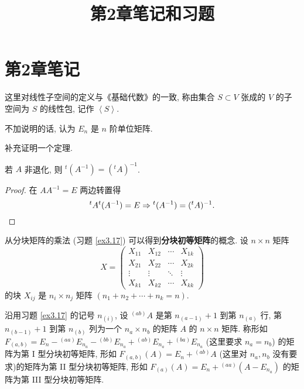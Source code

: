 \documentclass[color=black,device=normal,lang=cn,mode=geye]{elegantnote}
\title{第2章笔记和习题}
\begin{document}
\maketitle
\section{第2章笔记}
这里对线性子空间的定义与《基础代数》的一致, 称由集合 $S\subset V$ 张成的 $V$ 的子空间为 $S$ 的线性包, 记作 $\left<S\right>$.

不加说明的话, 认为 $E_n$ 是 $n$ 阶单位矩阵.

补充证明一个定理.
\begin{theorem}
    若 $A$ 非退化, 则 ${}^t(A^{-1})=({}^tA)^{-1}$.
\end{theorem}
\begin{proof}
    在 $AA^{-1}=E$ 两边转置得
    \[{}^tA{}^t(A^{-1})=E\Rightarrow{}^t(A^{-1})=({}^tA)^{-1}.\qedhere\]
\end{proof}

从分块矩阵的乘法 (习题 \ref{ex3.17}) 可以得到\textbf{分块初等矩阵}的概念. 设 $n\times n$ 矩阵
\[X=\begin{pmatrix}
    X_{11} & X_{12} & \cdots & X_{1k} \\
    X_{21} & X_{22} & \cdots & X_{2k} \\
    \vdots & \vdots & \ddots & \vdots \\
    X_{k1} & X_{k2} & \cdots & X_{kk}
\end{pmatrix}\]
的块 $X_{ij}$ 是 $n_i\times n_j$ 矩阵 $(n_1+n_2+\cdots+n_k=n)$.
\begin{definition}
    沿用习题 \ref{ex3.17} 的记号 $n_{(i)}$, 设 ${}^{(ab)}A$ 是第 $n_{(a-1)}+1$ 到第 $n_{(a)}$ 行, 第 $n_{(b-1)}+1$ 到第 $n_{(b)}$ 列为一个 $n_a\times n_b$ 的矩阵 $A$ 的 $n\times n$ 矩阵. 称形如 $F_{(a,b)}=E_n-{}^{(aa)}E_{n_a}-{}^{(bb)}E_{n_a}+{}^{(ab)}E_{n_a}+{}^{(ba)}E_{n_a}$ (这里要求 $n_a=n_b$) 的矩阵为第 I 型分块初等矩阵, 形如 $F_{(a,b)}(A)=E_n+{}^{(ab)}A$ (这里对 $n_a,n_b$ 没有要求)的矩阵为第 II 型分块初等矩阵, 形如 $F_{(a)}(A)=E_n+{}^{(aa)}(A-E_{n_a})$ 的矩阵为第 III 型分块初等矩阵.
\end{definition}
\end{document}
